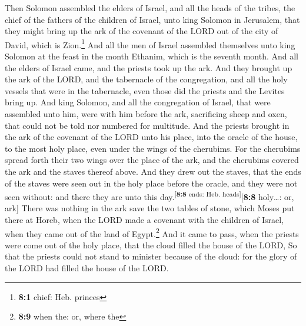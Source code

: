  Then Solomon assembled the elders of Israel, and all the
heads of the tribes, the chief of the fathers of the children of Israel,
unto king Solomon in Jerusalem, that they might bring up the ark of the
covenant of the LORD out of the city of David, which is Zion.\footnote{\textbf{8:1}
  chief: Heb. princes}  And all the men of Israel
assembled themselves unto king Solomon at the feast in the month
Ethanim, which is the seventh month.  And all the elders
of Israel came, and the priests took up the ark.  And they
brought up the ark of the LORD, and the tabernacle of the congregation,
and all the holy vessels that were in the tabernacle, even those did the
priests and the Levites bring up.  And king Solomon, and
all the congregation of Israel, that were assembled unto him, were with
him before the ark, sacrificing sheep and oxen, that could not be told
nor numbered for multitude.  And the priests brought in
the ark of the covenant of the LORD unto his place, into the oracle of
the house, to the most holy place, even under the wings of the
cherubims.  For the cherubims spread forth their two wings
over the place of the ark, and the cherubims covered the ark and the
staves thereof above.  And they drew out the staves, that
the ends of the staves were seen out in the holy place before the
oracle, and they were not seen without: and there they are unto this
day.\textsuperscript{{[}\textbf{8:8} ends: Heb. heads{]}}{[}\textbf{8:8}
holy\ldots: or, ark{]}  There was nothing in the ark save
the two tables of stone, which Moses put there at Horeb, when the LORD
made a covenant with the children of Israel, when they came out of the
land of Egypt.\footnote{\textbf{8:9} when the: or, where the}
 And it came to pass, when the priests were come out of
the holy place, that the cloud filled the house of the LORD,
 So that the priests could not stand to minister because
of the cloud: for the glory of the LORD had filled the house of the
LORD.

